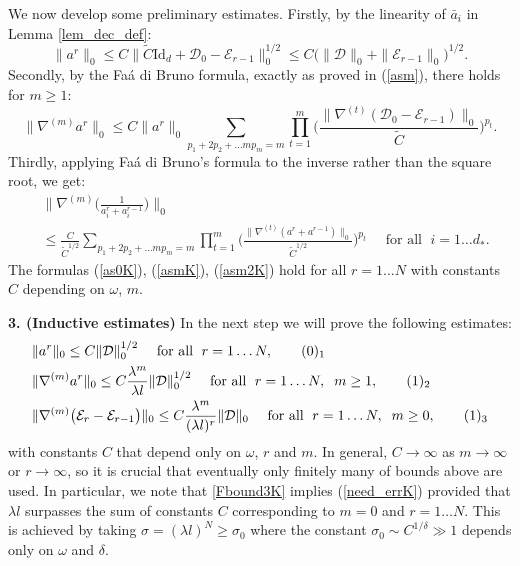 \documentclass[reqno,twoside,11pt]{amsart}
\newcommand{\Id}{\mathrm{Id}}
\numberwithin{equation}{section}
\theoremstyle{plain}
\theoremstyle{definition}
\begin{document}
We now develop some preliminary estimates. Firstly, by  the linearity of $\bar
a_i$ in Lemma \ref{lem_dec_def}:
\begin{equation}\label{as0K}
\|a^r\|_0\leq C\| \tilde C \Id_d +
\mathcal{D}_0-\mathcal{E}_{r-1}\|_0^{1/2}\leq C \big(\|\mathcal{D}\|_0
+ \|\mathcal{E}_{r-1}\|_0\big)^{1/2}.
\end{equation}
Secondly, by the  Fa\'a di Bruno formula, exactly as proved in
(\ref{asm}), there holds for $m\geq 1$: 
\begin{equation}\label{asmK}
\|\nabla^{(m)}a^r\|_0 \leq C \|a^r\|_0\sum_{p_1+2p_2+\ldots mp_m=m}\prod_{t=1}^m
\Big(\frac{\|\nabla^{(t)}(\mathcal{D}_0-\mathcal{E}_{r-1})\|_0}{\tilde C}\Big)^{p_t}.
\end{equation}
Thirdly, applying Fa\'a di Bruno's formula to the inverse rather
than the square root, we get:
\begin{equation}\label{asm2K}
\begin{split}
& \|\nabla^{(m)}\Big(\frac{1}{a^{r}_i+a^{r-1}_i}\Big)\|_0 \\ & \leq \frac{C}{\tilde
C^{1/2}} \sum_{p_1+2p_2+\ldots mp_m=m}\prod_{t=1}^m
\Big(\frac{\|\nabla^{(t)}(a^{r} + a^{r-1})\|_0}{\tilde
  C^{1/2}}\Big)^{p_t} \quad\mbox{ for all }\; i=1\ldots d_*.
\end{split}
\end{equation}
The formulas (\ref{as0K}), (\ref{asmK}), (\ref{asm2K}) hold for all
$r=1\ldots N$ with constants $C$ depending on $\omega$, $m$.

\bigskip

{\bf 3. (Inductive estimates)} In the next step we will prove the following estimates:
\begin{align*}
&  \|a^r\|_0\leq C\|\mathcal{D}\|_0^{1/2} \quad\mbox{
  for all }\; r=1\ldots N, \tag*{(\theequation)$_1$}\refstepcounter{equation} \label{Fbound1K}\medskip\\
& \|\nabla^{(m)} a^r\|_0\leq C \frac{\lambda^{m}}{\lambda l}\|\mathcal{D}\|_0^{1/2} 
\quad\mbox{ for all }\; r=1\ldots N, \; \; m\geq 1, \tag*{(\theequation)$_2$}\label{Fbound2K} \medskip\\
& \|\nabla^{(m)} \big(\mathcal{E}_r-\mathcal{E}_{r-1}\big)\|_0 \leq
C \frac{\lambda^{m}}{(\lambda l)^r}\|\mathcal{D}\|_0
\quad\mbox{ for all }\; r=1\ldots N, \;\;
m\geq 0, \tag*{(\theequation)$_3$}\label{Fbound3K}
\end{align*}
with constants $C$ that depend only on $\omega$, $r$ and $m$. In general,
$C\to\infty$ as $m\to \infty$ or $r\to \infty$, so it is crucial that eventually
only finitely many of bounds above are used.
In particular, we note that \ref{Fbound3K} implies (\ref{need_errK}) provided
that $\lambda l$ surpasses the sum of constants $C$ corresponding to
$m=0$ and $r=1\ldots N$. This is achieved by taking $\sigma = (\lambda
l)^N\geq \sigma_0$ where the constant $\sigma_0\sim C^{1/\delta}\gg 1$
depends only on $\omega$ and $\delta$. 
\end{document}
